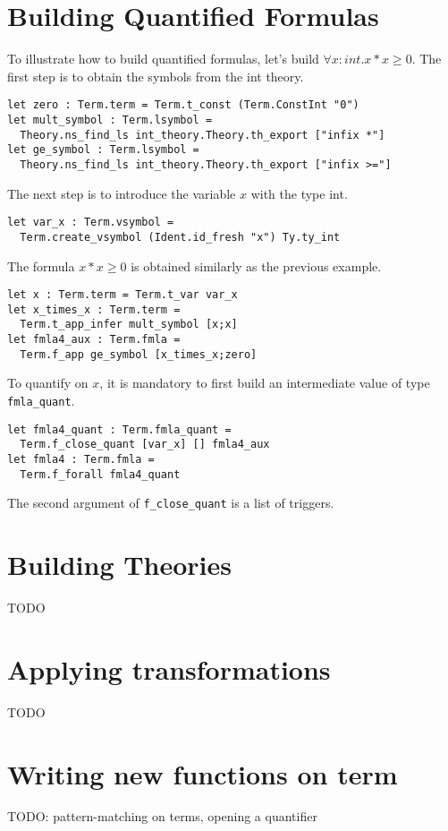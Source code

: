 \section{Building Quantified Formulas}

To illustrate how to build quantified formulas, let's build $\forall x:int. x*x \geq 0$. The first step is to obtain the symbols from the int theory.
\begin{verbatim}
let zero : Term.term = Term.t_const (Term.ConstInt "0")
let mult_symbol : Term.lsymbol = 
  Theory.ns_find_ls int_theory.Theory.th_export ["infix *"]
let ge_symbol : Term.lsymbol = 
  Theory.ns_find_ls int_theory.Theory.th_export ["infix >="]
\end{verbatim}
The next step is to introduce the variable $x$ with the type int.
\begin{verbatim}
let var_x : Term.vsymbol = 
  Term.create_vsymbol (Ident.id_fresh "x") Ty.ty_int
\end{verbatim}
The formula $x*x \geq 0$ is obtained similarly as the previous example.
\begin{verbatim}
let x : Term.term = Term.t_var var_x
let x_times_x : Term.term = 
  Term.t_app_infer mult_symbol [x;x] 
let fmla4_aux : Term.fmla = 
  Term.f_app ge_symbol [x_times_x;zero]
\end{verbatim}
To quantify on $x$, it is mandatory to first build an intermediate
value of type \texttt{fmla\_quant}.
\begin{verbatim}
let fmla4_quant : Term.fmla_quant = 
  Term.f_close_quant [var_x] [] fmla4_aux
let fmla4 : Term.fmla =
  Term.f_forall fmla4_quant
\end{verbatim}
The second argument of \texttt{f\_close\_quant} is a list of triggers.

\section{Building Theories}

TODO

\section{Applying transformations}

TODO

\section{Writing new functions on term}

TODO: pattern-matching on terms, opening a quantifier

